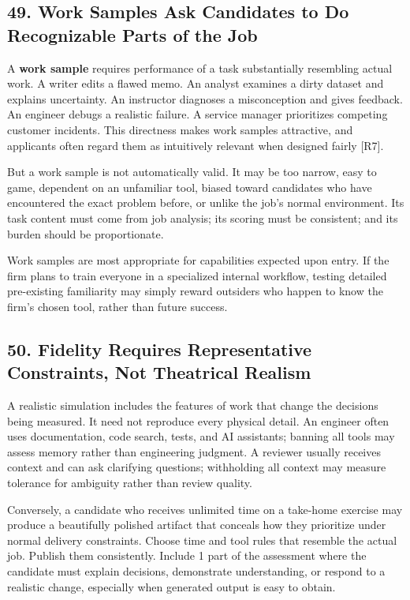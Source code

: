 \subsection*{49. Work Samples Ask Candidates to Do Recognizable Parts of the Job}

A \textbf{work sample} requires performance of a task substantially resembling actual work. A writer edits a flawed memo. An analyst examines a dirty dataset and explains uncertainty. An instructor diagnoses a misconception and gives feedback. An engineer debugs a realistic failure. A service manager prioritizes competing customer incidents. This directness makes work samples attractive, and applicants often regard them as intuitively relevant when designed fairly [R7].

But a work sample is not automatically valid. It may be too narrow, easy to game, dependent on an unfamiliar tool, biased toward candidates who have encountered the exact problem before, or unlike the job's normal environment. Its task content must come from job analysis; its scoring must be consistent; and its burden should be proportionate.

Work samples are most appropriate for capabilities expected upon entry. If the firm plans to train everyone in a specialized internal workflow, testing detailed pre-existing familiarity may simply reward outsiders who happen to know the firm's chosen tool, rather than future success.

\subsection*{50. Fidelity Requires Representative Constraints, Not Theatrical Realism}

A realistic simulation includes the features of work that change the decisions being measured. It need not reproduce every physical detail. An engineer often uses documentation, code search, tests, and AI assistants; banning all tools may assess memory rather than engineering judgment. A reviewer usually receives context and can ask clarifying questions; withholding all context may measure tolerance for ambiguity rather than review quality.

Conversely, a candidate who receives unlimited time on a take-home exercise may produce a beautifully polished artifact that conceals how they prioritize under normal delivery constraints. Choose time and tool rules that resemble the actual job. Publish them consistently. Include 1 part of the assessment where the candidate must explain decisions, demonstrate understanding, or respond to a realistic change, especially when generated output is easy to obtain.

